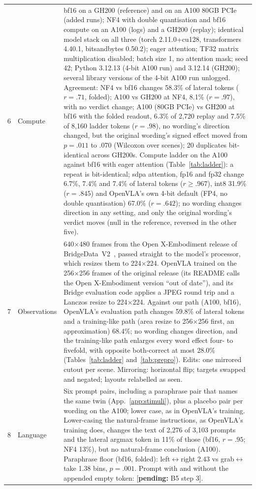 \documentclass[conference]{IEEEtran}
\newcommand{\pending}[1]{\textcolor{orange!85!black}{[\textbf{pending:} #1]}}
\begin{document}
\begin{table}[t]
\begin{tabular}{@{}r L{3.0cm} L{13.6cm}@{}}
6 & Compute & bf16 on a GH200 (reference) and on an A100 80GB PCIe (added runs); NF4 with double quantisation and bf16 compute on an A100 (logs) and a GH200 (replay); identical model stack on all three (torch 2.11.0+cu128, transformers 4.40.1, bitsandbytes 0.50.2); eager attention; TF32 matrix multiplication disabled; batch size 1, no attention mask; seed 42; Python 3.12.13 (4-bit A100 run) and 3.12.14 (GH200); several library versions of the 4-bit A100 run unlogged. Agreement: NF4 vs bf16 changes 58.3\% of lateral tokens ($r=.71$, folded); A100 vs GH200 at NF4, 8.1\% ($r=.97$), with no verdict change; A100 (80GB PCIe) vs GH200 at bf16 with the folded readout, 6.3\% of 2,720 replay and 7.5\% of 8,160 ladder tokens ($r=.98$), no wording's direction changed, but the original wording's signed effect moved from $p=.011$ to .070 (Wilcoxon over scenes); 20 duplicates bit-identical across GH200s. Compute ladder on the A100 against bf16 with eager attention (Table~\ref{tab:ladder}): a repeat is bit-identical; sdpa attention, fp16 and fp32 change 6.7\%, 7.4\% and 7.4\% of lateral tokens ($r\geq.967$), int8 31.9\% ($r=.845$) and OpenVLA's own 4-bit default (FP4, no double quantisation) 67.0\% ($r=.642$); no wording changes direction in any setting, and only the original wording's verdict moves (null in the reference, reversed in the other five).\\
7 & Observations & 640$\times$480 frames from the Open X-Embodiment release of BridgeData~V2~\cite{oneill2024open}, passed straight to the model's processor, which resizes them to 224$\times$224. OpenVLA trained on the 256$\times$256 frames of the original release (its README calls the Open X-Embodiment version ``out of date''), and its Bridge evaluation code applies a JPEG round trip and a Lanczos resize to 224$\times$224. Against our path (A100, bf16), OpenVLA's evaluation path changes 59.8\% of lateral tokens and a training-like path (area resize to 256$\times$256 first, an approximation) 68.4\%; no wording changes direction, and the training-like path enlarges every word effect four- to fivefold, with opposite both-correct at most 28.0\% (Tables~\ref{tab:ladder} and~\ref{tab:prepro}). Edits: one mirrored cutout per scene. Mirroring: horizontal flip; targets swapped and negated; layouts relabelled as seen.\\
8 & Language & Six prompt pairs, including a paraphrase pair that names the same twin (App.~\ref{app:stimuli}), plus a placebo pair per wording on the A100; lower case, as in OpenVLA's training. Lower-casing the natural-frame instructions, as OpenVLA's training does, changes the text of 2,276 of 3,103 prompts and the lateral argmax token in 11\% of those (bf16, $r=.95$; NF4 13\%), but no natural-frame conclusion (A100). Paraphrase floor (bf16, folded): left$\leftrightarrow$right 2.43 vs grab$\leftrightarrow$take 1.38 bins, $p=.001$. Prompt with and without the appended empty token: \pending{B5 step 3}.\\

\end{tabular}
\end{table}
\end{document}
